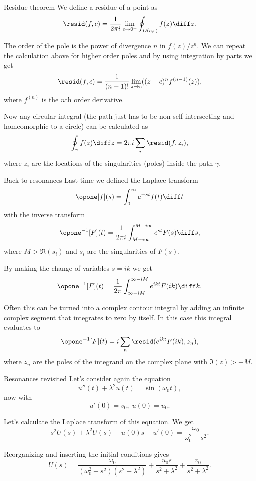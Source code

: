 \begin{frame}{Residue theorem}
	We define a residue of a point as 
	\[ \resid(f,c) = \frac{1}{2\pi i}\lim_{\epsilon \to 0^{+}} \oint_{D(c,\epsilon)} f(z) \diff z.  \]
	
	\pause
	The order of the pole is the power of divergence $ n $ in $ f(z)/z^n $. We can repeat the calculation above for higher order poles and by using integration by parts we get 
	\[ \resid(f,c) = \frac{1}{(n-1)!} \lim_{z \to c} ((z-c)^n f^{(n-1)}(z)), \]
	where $ f^{(n)} $ is the $ n $th order derivative.
	
	\pause
	Now any circular integral (the path just has to be non-self-intersecting and homeomorphic to a circle) can be calculated as 
	\[ \oint_\gamma f(z) \diff z = 2\pi i \sum_{i} \resid(f,z_i),  \]
	where $ z_i $ are the locations of the singularities (poles) inside the path $ \gamma $.
\end{frame}

\begin{frame}{Back to resonances}
	Last time we defined the Laplace transform 
	\[ \opone[f](s) = \int_{0}^{\infty} e^{-st} f(t) \diff t \]
	with the inverse transform 
	\[ \opone^{-1}[F](t) = \frac{1}{2\pi i} \int_{M - i\infty}^{M + i\infty} e^{st} F(s) \diff s,  \]
	where $ M > \Re(s_i) $ and $ s_i $ are the singularities of $ F(s) $.
\end{frame}

\begin{frame}
	By making the change of variables $ s = i k $ we get 
	\[ \opone^{-1}[F](t) = \frac{1}{2\pi} \int_{\infty - iM}^{\infty - iM} e^{ikt} F(ik) \diff k.  \]
	
	\pause
	Often this can be turned into a complex contour integral by adding an infinite complex segment that integrates to zero by itself. In this case this integral evaluates to
	\[ \opone^{-1}[F](t) = i \sum_{n} \resid(e^{ikt} F(ik), z_n), \]
	where $ z_n $ are the poles of the integrand on the complex plane with $ \Im(z) > -M $. 
\end{frame}

\begin{frame}{Resonances revisited}
	Let's consider again the equation 
	\[ u''(t) + \lambda^2 u(t) = \sin(\omega_0 t), \]
	now with 
	\[ u'(0) = v_0, \; u(0) = u_0. \]
	
	\pause
	Let's calculate the Laplace transform of this equation. We get 
	\[ s^2 U(s) + \lambda^2 U(s) - u(0)s - u'(0) = \frac{\omega_0}{\omega_0^2 + s^2}. \]
	
	\pause
	Reorganizing and inserting the initial conditions gives
	\[ U(s) = \frac{\omega_0}{(\omega_0^2 + s^2)(s^2 + \lambda^2)} + \frac{u_0 s}{s^2 + \lambda^2} + \frac{v_0}{s^2 + \lambda^2}. \]
	
\end{frame}

